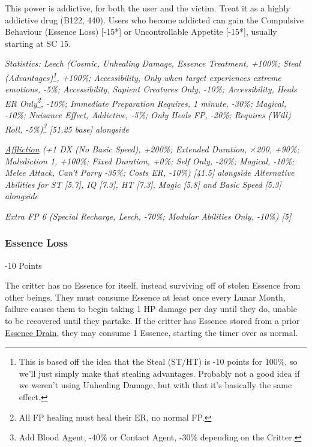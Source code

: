 \begin{multicols*}{3}
	This power is addictive, for both the user and the victim. Treat it as a highly addictive drug (B122, 440). Users who become addicted can gain the Compulsive Behaviour (Essence Loss) [-15*] or Uncontrollable Appetite [-15*], usually starting at SC 15.
	
	\textcolor{OliveGreen}{\textit{Statistics: Leech (Cosmic, Unhealing Damage, Essence Treatment, +100\%; Steal (Advantages)\footnote{This is based off the idea that the Steal (ST/HT) is -10 points for 100\%, so we'll just simply make that stealing advantages. Probably not a good idea if we weren't using Unhealing Damage, but with that it's basically the same effect.}, +100\%; Accessibility, Only when target experiences extreme emotions, -5\%; Accessibility, Sapient Creatures Only, -10\%; Accessibility, Heals ER Only\footnote{All FP healing must heal their ER, no normal FP.}, -10\%; Immediate Preparation Requires, 1 minute, -30\%; Magical, -10\%; Nuisance Effect, Addictive, -5\%; Only Heals FP, -20\%; Requires (Will) Roll, -5\%)\footnote{Add Blood Agent, -40\% or Contact Agent, -30\% depending on the Critter.} [51.25 base] alongside}}
			
	 \textcolor{OliveGreen}{\textit{\textcolor{Blue}{\href{http://forums.sjgames.com/showthread.php?t=152300}{Affliction}} (+1 DX (No Basic Speed), +200\%; Extended Duration, $\times$200, +90\%; Malediction 1, +100\%; Fixed Duration, +0\%; Self Only, -20\%; Magical, -10\%; Melee Attack, Can't Parry -35\%; Costs ER, -10\%) [41.5] alongside Alternative Abilities for ST [5.7], IQ [7.3], HT [7.3], Magic [5.8] and Basic Speed [5.3] alongside}}
	 
	 \textcolor{OliveGreen}{\textit{ Extra FP 6 (Special Recharge, Leech, -70\%; Modular Abilities Only, -10\%) [5] }}
	 
	 
	 \subsubsection{Essence Loss}\label{essence_loss}
	 \begin{flushright}
	 	-10 Points
	 \end{flushright}
 
 	The critter has no Essence for itself, instead surviving off of stolen Essence from other beings. They must consume Essence at least once every Lunar Month, failure causes them to begin taking 1 HP damage per day until they do, unable to be recovered until they partake. If the critter has Essence stored from a prior \hyperref[essence_drain]{Essence Drain}, they may consume 1 Essence, starting the timer over as normal.
 	

\end{multicols*}
